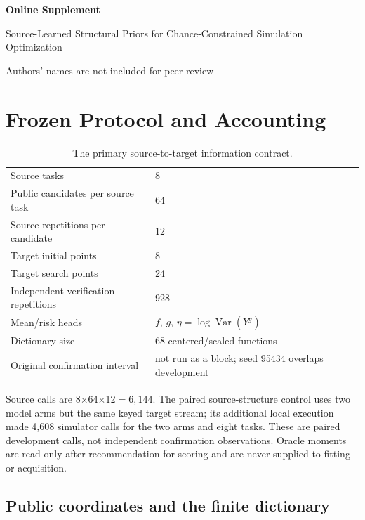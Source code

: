 \documentclass[opre,dblanonrev]{informs4}
\begin{document}
\ECSwitch
\raggedbottom
\begin{center}
{\Large\bfseries Online Supplement}\par
\vspace{0.6em}
{\large Source-Learned Structural Priors for Chance-Constrained
Simulation Optimization}\par
\vspace{0.4em}
Authors' names are not included for peer review
\end{center}

\section{Frozen Protocol and Accounting}

\begin{table}[h]
\centering
\caption{The primary source-to-target information contract.}
\label{tab:mp_protocol}
\begin{tabular}{ll}
\toprule
Source tasks & 8\\
Public candidates per source task & 64\\
Source repetitions per candidate & 12\\
Target initial points & 8\\
Target search points & 24\\
Independent verification repetitions & 928\\
Mean/risk heads & $f$, $g$, $\eta=\log\operatorname{Var}(Y^g)$\\
Dictionary size & 68 centered/scaled functions\\
Original confirmation interval & not run as a block; seed 95434 overlaps development\\
\bottomrule
\end{tabular}
\end{table}

Source calls are 8$\times$64$\times$12$=6{,}144$.  The paired
source-structure control uses two model arms but the same keyed target stream;
its additional local execution made 4,608 simulator calls for the two arms and
eight tasks.  These are paired development calls, not independent confirmation
observations.  Oracle moments are read only after recommendation for scoring and
are never supplied to fitting or acquisition.

\subsection{Public coordinates and the finite dictionary}
\end{document}
